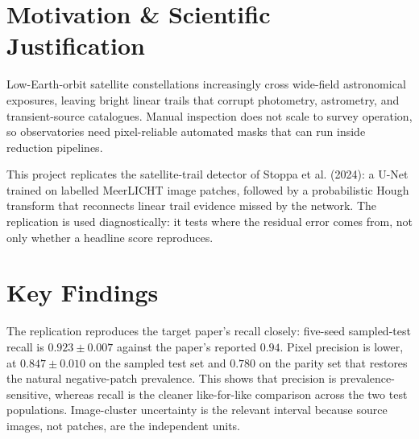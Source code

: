 \documentclass[10pt,a4paper,twocolumn]{article}
\begin{document}
\normalsize


\section*{Motivation \& Scientific Justification}
Low-Earth-orbit satellite constellations increasingly cross wide-field
astronomical exposures, leaving bright linear trails that corrupt photometry,
astrometry, and transient-source catalogues. Manual inspection does not scale
to survey operation, so observatories need pixel-reliable automated masks that
can run inside reduction pipelines.

This project replicates the satellite-trail detector of Stoppa et al. (2024):
a U-Net trained on labelled MeerLICHT image patches, followed by a probabilistic
Hough transform that reconnects linear trail evidence missed by the network. The
replication is used diagnostically: it tests where the residual error comes
from, not only whether a headline score reproduces.

\section*{Key Findings}
The replication reproduces the target paper's recall closely: five-seed
sampled-test recall is $0.923\pm0.007$ against the paper's reported $0.94$.
Pixel precision is lower, at $0.847\pm0.010$ on the sampled test set and
$0.780$ on the parity set that restores the natural negative-patch prevalence.
This shows that precision is prevalence-sensitive, whereas recall is the cleaner
like-for-like comparison across the two test populations. Image-cluster
uncertainty is the relevant interval because source images, not patches, are the
independent units.
\end{document}
